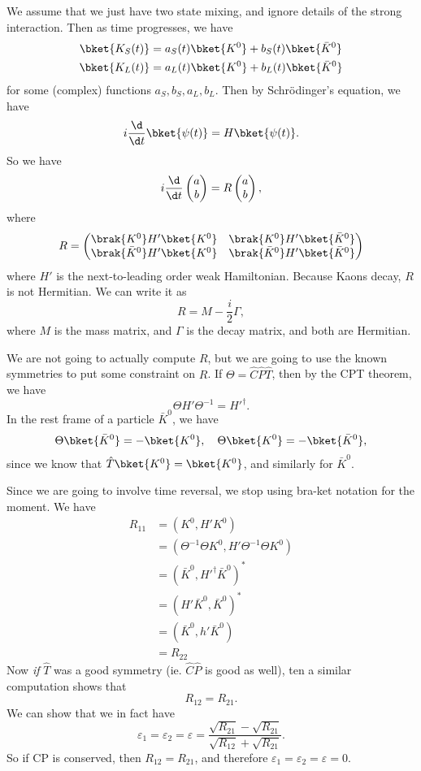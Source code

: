 \documentclass[a4paper]{article}
\begin{document}
We assume that we just have two state mixing, and ignore details of the strong interaction. Then as time progresses, we have
\begin{align*}
  \bket{K_S(t)} &= a_S(t) \bket{K^0} + b_S(t) \bket{\bar{K}^0}\\
  \bket{K_L(t)} &= a_L(t) \bket{K^0} + b_L(t) \bket{\bar{K}^0}
\end{align*}
for some (complex) functions $a_S, b_S, a_L, b_L$. Then by Schr\"odinger's equation, we have
\[
  i \frac{\d}{\d t} \bket{\psi(t)} = H \bket{\psi(t)}.
\]
So we have
\[
  i \frac{\d}{\d t}
  \begin{pmatrix}
    a\\ b
  \end{pmatrix} =
  R
  \begin{pmatrix}
    a\\b
  \end{pmatrix},
\]
where
\[
  R = 
  \begin{pmatrix}
    \brak{K^0}H' \bket{K^0} & \brak{K^0}H' \bket{\bar{K}^0}\\
    \brak{\bar{K}^0}H' \bket{K^0} & \brak{\bar{K}^0}H' \bket{\bar{K}^0}
  \end{pmatrix}
\]
where $H'$ is the next-to-leading order weak Hamiltonian. Because Kaons decay, $R$ is not Hermitian. We can write it as
\[
  R = M - \frac{i}{2} \Gamma,
\]
where $M$ is the mass matrix, and $\Gamma$ is the decay matrix, and both are Hermitian.

We are not going to actually compute $R$, but we are going to use the known symmetries to put some constraint on $R$. If $\Theta =  \hat{C}\hat{P}\hat{T}$,  then by the CPT theorem, we have
\[
  \Theta H' \Theta^{-1} = H'^\dagger. %
\]
In the rest frame of a particle $\bar{K}^0$, we have
\[
  \Theta \bket{\bar{K}^0} = - \bket{K^0},\quad \Theta \bket{K^0} = - \bket{\bar{K}^0},
\]
since we know that $\hat{T} \bket{K^0} = \bket{K^0}$, and similarly for $\bar{K}^0$.

Since we are going to involve time reversal, we stop using bra-ket notation for the moment. We have
\begin{align*}
  R_{11} &= (K^0, H' K^0) \\
  &= (\Theta^{-1}\Theta K^0,  H' \Theta^{-1}\Theta K^0)\\
  &= (\bar{K}^0, H'^\dagger \bar{K}^0)^*\\
  &= (H' \bar{K}^0, \bar{K}^0)^*\\
  &= (\bar K^0, h' \bar{K}^0)\\
  &= R_{22}
\end{align*}
Now \emph{if} $\hat{T}$ was a good symmetry (ie. $\hat{C}\hat{P}$ is good as well), ten a similar computation shows that
\[
  R_{12} = R_{21}.
\]
We can show that we in fact have
\[
  \varepsilon_1 = \varepsilon_2 = \varepsilon = \frac{\sqrt{R_{21}} - \sqrt{R_{21}}}{\sqrt{R_{12}} + \sqrt{R_{21}}}.
\]
So if CP is conserved, then $R_{12} = R_{21}$, and therefore $\varepsilon_1 = \varepsilon_2 = \varepsilon = 0$.
\end{document}
